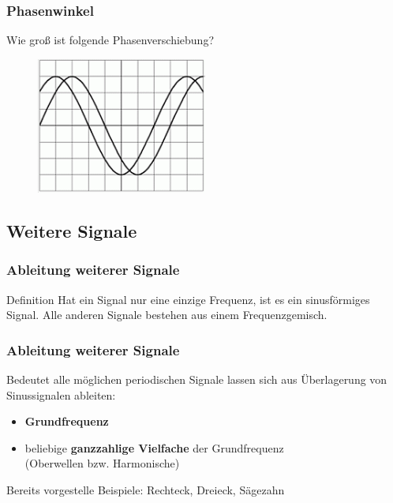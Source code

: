 \begin{frame}
  \frametitle{Phasenwinkel}

  \begin{block}{
    Wie groß ist folgende Phasenverschiebung?
    \begin{center}
      \begin{figure}
        \includegraphics[width=0.5\textwidth,height=.4\textheight,keepaspectratio]{a11/TB612.png}
      \end{figure}
    \end{center}
    }
  \end{block}


\end{frame}

\subsection{Weitere Signale}

\begin{frame}
  \frametitle{Ableitung weiterer Signale}

  \begin{block}{Definition}
    Hat ein Signal nur eine einzige Frequenz, ist es ein sinusförmiges Signal. Alle anderen Signale bestehen aus einem Frequenzgemisch.
  \end{block}

\end{frame}

\begin{frame}
  \frametitle{Ableitung weiterer Signale}

  Bedeutet alle möglichen periodischen Signale lassen sich aus Überlagerung von
  Sinussignalen ableiten:

  \begin{itemize}
    \item \textbf{Grundfrequenz}
    \item beliebige \textbf{ganzzahlige Vielfache} der Grundfrequenz \\
      (Oberwellen bzw. Harmonische)
  \end{itemize}

  \bigskip Bereits vorgestelle Beispiele: Rechteck, Dreieck, Sägezahn
\end{frame}

